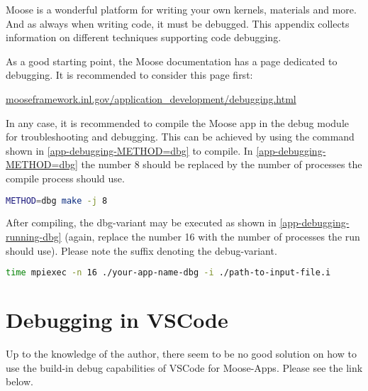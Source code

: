 Moose is a wonderful platform for writing your own kernels, materials and more.
And as always when writing code, it must be debugged. This appendix collects
information on different techniques supporting code debugging.

As a good starting point, the Moose documentation has a page dedicated to
debugging. It is recommended to consider this page first:

\href{https://mooseframework.inl.gov/application_development/debugging.html}{mooseframework.inl.gov/application\_development/debugging.html}

In any case, it is recommended to compile the Moose app in the debug module for
troubleshooting and debugging. This can be achieved by using the command shown
in \autoref{app-debugging-METHOD=dbg} to compile. In
\autoref{app-debugging-METHOD=dbg} the number 8 should be replaced by the
number of processes the compile process should use.

\begin{lstlisting}[language=bash, caption={Compile in dbg-mode},label={app-debugging-METHOD=dbg}]
METHOD=dbg make -j 8
\end{lstlisting}

After compiling, the dbg-variant may be executed as shown in
\autoref{app-debugging-running-dbg} (again, replace the number 16 with the
number of processes the run should use). Please note the suffix 
denoting the debug-variant.

\begin{lstlisting}[language=bash, caption={Executing the dbg-variant of a moose-app},label={app-debugging-running-dbg}]
time mpiexec -n 16 ./your-app-name-dbg -i ./path-to-input-file.i
\end{lstlisting}


\section{Debugging in VSCode}

Up to the knowledge of the author, there seem to be no good solution on how to
use the build-in debug capabilities of VSCode for Moose-Apps. Please see the
link below.

